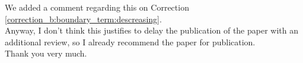 \documentclass[a4paper,10pt]{report}
\begin{document}
\ans We added a comment regarding this on Correction \ref{correction_b:boundary_term:descreasing}.\\

\que Anyway, I don't think this justifies to delay the publication of the paper with an additional review, so I already recommend the paper for publication.\\

\ans Thank you very much.\\


%






\end{document}
